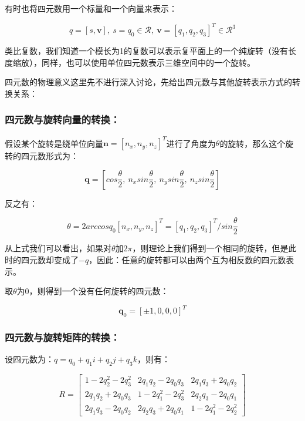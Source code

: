\documentclass[9pt, oneside]{book}
\begin{document}
有时也将四元数用一个标量和一个向量来表示：

\begin{equation}
    q = [s,\textbf{v}],\ s = q_0 \in \mathcal{R}, \ \textbf{v} = [q_1,q_2,q_3]^T \in \mathcal{R}^3
\end{equation}

类比复数，我们知道一个模长为1的复数可以表示复平面上的一个纯旋转（没有长度缩放），同样，也可以使用单位四元数表示三维空间中的一个旋转。

四元数的物理意义这里先不进行深入讨论，先给出四元数与其他旋转表示方式的转换关系：

\subsubsection{四元数与旋转向量的转换：}

假设某个旋转是绕单位向量$\textbf{n} = [n_x,n_y,n_z]^T$进行了角度为$\theta$的旋转，那么这个旋转的四元数形式为：

\begin{equation}
    \textbf{q} = [cos\frac{\theta}{2},\ n_xsin\frac{\theta}{2},\ n_ysin\frac{\theta}{2},\ n_zsin\frac{\theta}{2}]
\end{equation}

反之有：

\begin{equation}
    \theta = 2arccosq_0
    [n_x,n_y,n_z]^T = [q_1,q_2,q_3]^T/sin\frac{\theta}{2}
\end{equation}

从上式我们可以看出，如果对$\theta$加$2\pi$，则理论上我们得到一个相同的旋转，但是此时的四元数却变成了$-q$，因此：任意的旋转都可以由两个互为相反数的四元数表示。

取$\theta$为0，则得到一个没有任何旋转的四元数：

\begin{equation}
    \textbf{q}_0 = [\pm 1,0,0,0]^T
\end{equation}

\subsubsection{四元数与旋转矩阵的转换：}

设四元数为：$q = q_0 + q_1i + q_2j + q_3k$，则有：

\begin{equation}
    R = 
    \begin{bmatrix}
     1-2q_2^2-2q_3^2   & 2q_1q_2-2q_0q_3  & 2q_1q_3+2q_0q_2 \\
     2q_1q_2+2q_0q_3 & 1-2q_1^2-2q_3^2   & 2q_2q_3-2q_0q_1\\
     2q_1q_3-2q_0q_2  & 2q_2q_3+2q_0q_1 & 1-2q_1^2-2q_2^2
    \end{bmatrix}
\end{equation}
\end{document}
